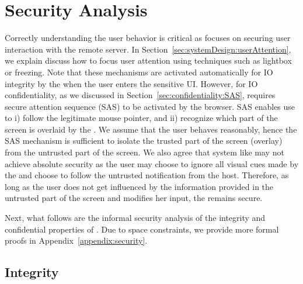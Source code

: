 \section{Security Analysis}
\label{sec:securityAnalysis}



 Correctly understanding the user behavior is critical as \name focuses on securing user interaction with the remote server. In Section~\ref{sec:systemDesign:userAttention}, we explain discuss how to focus user attention using techniques such as lightbox or freezing. Note that these mechanisms are activated automatically for IO integrity by the \device when the user enters the sensitive UI. However, for IO confidentiality, as we discussed in Section~\ref{sec:confidentiality:SAS}, \name requires secure attention sequence (SAS) to be activated by the browser. SAS enables use to i) follow the legitimate mouse pointer, and ii) recognize which part of the screen is overlaid by the \device. We assume that the user behaves reasonably, hence the SAS mechanism is sufficient to isolate the trusted part of the screen (\device overlay) from the untrusted part of the screen. We also agree that system like \name may not achieve absolute security as the user may choose to ignore all visual cues made by the \device and choose to follow the untrusted notification from the host. Therefore, as long as the user does not get influenced by the information provided in the untrusted part of the screen and modifies her input, the \name remains secure.


Next, what follows are the informal security analysis of the integrity and confidential properties of \name. Due to space constraints, we provide more formal proofs in Appendix~\ref{appendix:security}.


\subsection{Integrity}
\label{sec:securityAnalysis:integrity}

